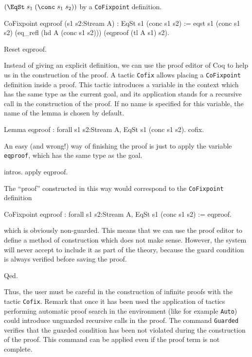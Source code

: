\noindent $(\EqSt\;s_1\;(\conc\;s_1\;s_2))$ by a \verb!CoFixpoint!
definition.
\begin{coq_example}
CoFixpoint eqproof (s1 s2:Stream A) : EqSt s1 (conc s1 s2) :=
  eqst s1 (conc s1 s2) (eq_refl (hd A (conc s1 s2)))
    (eqproof (tl A s1) s2).
\end{coq_example}
\begin{coq_eval}
Reset eqproof.
\end{coq_eval}
\noindent Instead of giving an explicit definition, 
we can use the proof editor of Coq to help us in 
the construction of the proof.
A tactic \verb!Cofix! allows placing a \verb!CoFixpoint! definition
inside a proof. 
This tactic introduces a variable in the context which has
the same type as the current goal, and its application stands
for a recursive call in the construction of the proof. If no name is
specified for this variable, the name of the lemma  is chosen by
default.

\begin{coq_example}
Lemma eqproof : forall s1 s2:Stream A, EqSt s1 (conc s1 s2).
cofix.
\end{coq_example}

\noindent An easy (and wrong!) way of finishing the proof is just to apply the
variable \verb!eqproof!, which has the same type as the goal. 

\begin{coq_example}
intros.
apply eqproof.
\end{coq_example}

\noindent The ``proof'' constructed in this way 
would correspond to the \verb!CoFixpoint! definition
\begin{coq_example*}
CoFixpoint eqproof  : forall s1 s2:Stream A, EqSt s1 (conc s1 s2) :=
  eqproof.
\end{coq_example*}

\noindent which is obviously non-guarded. This means that 
we can use the proof editor to
define a method of construction which does not make sense. However,
the system will never accept to include it as part of the theory,
because the guard condition is always verified before saving the proof.

\begin{coq_example}
Qed.
\end{coq_example}

\noindent Thus, the user must be careful in the 
construction of infinite proofs 
with the tactic \verb!Cofix!. Remark that once it has been used 
the application of tactics performing automatic proof search in 
the environment (like for example \verb!Auto!)
could introduce unguarded recursive calls in the proof.
The command \verb!Guarded! verifies
that the guarded condition has been not violated 
during the construction of the proof. This command can be
applied even if the proof term is not complete.



